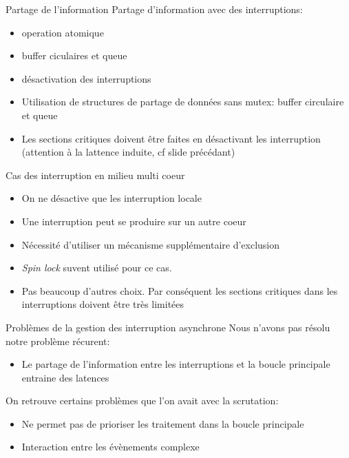\begin{frame}{Partage de l'information}
  Partage d'information avec des interruptions:
  \begin{itemize} 
  \item  operation atomique
  \item  buffer ciculaires et queue
  \item  désactivation des interruptions
  \end{itemize} 
  \begin{itemize} 
  \item Utilisation de structures de partage de données sans mutex: buffer circulaire et queue
  \item Les sections critiques  doivent être faites en désactivant les
    interruption (attention à la lattence induite, cf slide précédant)
  \end{itemize} 
\end{frame} 

\begin{frame}{Cas des interruption en milieu multi coeur}
  \begin{itemize} 
  \item On ne désactive que les interruption locale
  \item Une interruption peut se produire sur un autre coeur
  \item Nécessité d'utiliser un mécanisme supplémentaire d'exclusion
  \item \emph{Spin lock} suvent utilisé pour ce cas.
  \item  Pas  beaucoup  d'autres  choix.  Par  conséquent  les  sections
    critiques dans les interruptions doivent être très limitées
  \end{itemize} 
\end{frame} 

\begin{frame}{Problèmes de la gestion des interruption asynchrone}
  Nous n'avons pas résolu notre problème récurent:
  \begin{itemize} 
  \item  Le partage  de l'information  entre les  interruptions  et la
    boucle principale entraine des latences
  \end{itemize} 
  On retrouve certains problèmes que l'on avait avec la scrutation:
  \begin{itemize} 
  \item Ne permet pas de prioriser les traitement dans la boucle principale
  \item Interaction entre les évènements complexe
  \end{itemize} 
\end{frame} 

